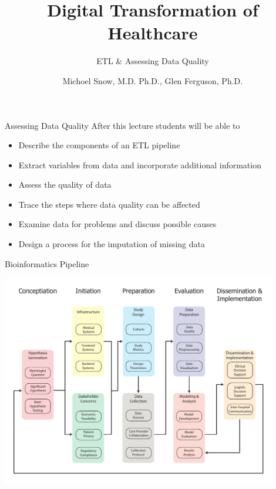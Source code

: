 \documentclass[10pt, xcolor=table]{beamer}
\title{Digital Transformation of Healthcare}
\subtitle{ETL \& Assessing Data Quality}
\date{}
\author{Michoel Snow, M.D. Ph.D., Glen Ferguson, Ph.D.}
\institute{Center for Health Data Innovations}
\begin{document}
\maketitle


\begin{frame}{Assessing Data Quality}
	After this lecture students will be able to 
	\begin{itemize}
		\item Describe the components of an ETL pipeline
		\item Extract variables from data and incorporate additional information
		\item Assess the quality of data
		\item Trace the steps where data quality can be affected 	
		\item Examine data for problems and discuss possible causes
		\item Design a process for the imputation of missing data 
	\end{itemize}
\end{frame}


\begin{frame}{Bioinformatics Pipeline}
	\begin{center}
		\includegraphics[width=0.9\textwidth]{images/informatics_pipeline.pdf}	
	\end{center}
\end{frame}
\end{document}
